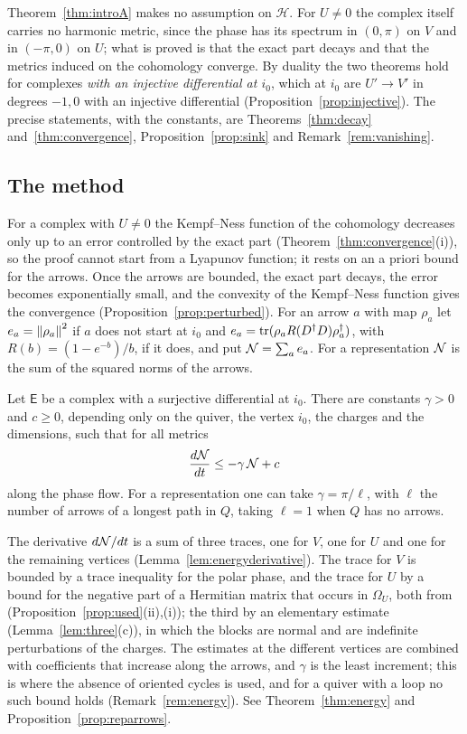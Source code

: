 Theorem~\ref{thm:introA} makes no assumption on $\mathcal H$. For $U\neq0$
the complex itself carries no harmonic metric, since the phase has its
spectrum in $(0,\pi)$ on $V$ and in $(-\pi,0)$ on $U$; what is proved is that
the exact part decays and that the metrics induced on the cohomology
converge. By duality \cite[Theorem~5.1]{wue26c} the two theorems hold for
complexes \emph{with an injective differential at $i_0$}, which at $i_0$ are
$U'\to V'$ in degrees $-1,0$ with an injective differential
(Proposition~\ref{prop:injective}). The precise statements, with the
constants, are Theorems~\ref{thm:decay} and~\ref{thm:convergence},
Proposition~\ref{prop:sink} and Remark~\ref{rem:vanishing}.

\subsection{The method}
For a complex with $U\neq0$ the Kempf--Ness function of the cohomology
decreases only up to an error controlled by the exact part
(Theorem~\ref{thm:convergence}(i)), so the proof cannot start from a
Lyapunov function; it rests on an a priori bound for the arrows. Once the arrows are
bounded, the exact part decays, the error becomes exponentially small, and
the convexity of the Kempf--Ness function gives the convergence
(Proposition~\ref{prop:perturbed}). For an arrow $a$ with map $\rho_a$ let
$e_a=\left\lVert\rho_a\right\rVert^2$ if $a$ does not start at $i_0$ and
$e_a=\operatorname{tr}(\rho_aR(D^\dagger D)\rho_a^\dagger)$, with $R(b)=(1-e^{-b})/b$, if it
does, and put $\mathcal N=\sum_ae_a$. For a representation $\mathcal N$ is the sum of the
squared norms of the arrows.

\begin{theorem}\label{thm:introC}
Let $\mathsf E$ be a complex with a surjective differential at $i_0$. There
are constants $\gamma>0$ and $c\geq0$, depending only on the quiver, the
vertex $i_0$, the charges and the dimensions, such that for all metrics
\[
 \frac{d\mathcal N}{dt}\leq-\gamma\,\mathcal N+c
\]
along the phase flow. For a representation one can take $\gamma=\pi/\ell$,
with $\ell$ the number of arrows of a longest path in $Q$, taking $\ell=1$
when $Q$ has no arrows.
\end{theorem}

The derivative $d\mathcal N/dt$ is a sum of three traces, one for $V$, one for $U$
and one for the remaining vertices (Lemma~\ref{lem:energyderivative}). The
trace for $V$ is bounded by a trace inequality for the polar phase, and the
trace for $U$ by a bound for the negative part of a Hermitian matrix that
occurs in $\Omega_U$, both from \cite{wue26b}
(Proposition~\ref{prop:used}(ii),(i)); the third by an elementary estimate
(Lemma~\ref{lem:three}(c)), in which the blocks are normal and are
indefinite perturbations of the charges. The estimates at the different
vertices are combined with coefficients that increase along the arrows, and
$\gamma$ is the least increment; this is where the absence of oriented
cycles is used, and for a quiver with a loop no such bound holds
(Remark~\ref{rem:energy}). See Theorem~\ref{thm:energy} and
Proposition~\ref{prop:reparrows}.

